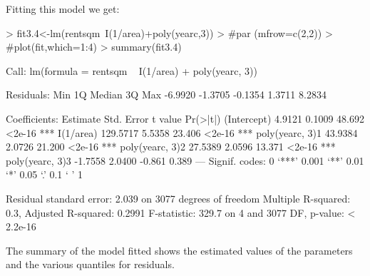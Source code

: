 \documentclass[12pt]{article}
\begin{document}
Fitting this model we get:
\begin{Schunk}
\begin{Sinput}
> fit3.4<-lm(rentsqm~I(1/area)+poly(yearc,3))
> #par (mfrow=c(2,2))
> #plot(fit,which=1:4)
> summary(fit3.4)
\end{Sinput}
\begin{Soutput}
Call:
lm(formula = rentsqm ~ I(1/area) + poly(yearc, 3))

Residuals:
    Min      1Q  Median      3Q     Max 
-6.9920 -1.3705 -0.1354  1.3711  8.2834 

Coefficients:
                Estimate Std. Error t value Pr(>|t|)    
(Intercept)       4.9121     0.1009  48.692   <2e-16 ***
I(1/area)       129.5717     5.5358  23.406   <2e-16 ***
poly(yearc, 3)1  43.9384     2.0726  21.200   <2e-16 ***
poly(yearc, 3)2  27.5389     2.0596  13.371   <2e-16 ***
poly(yearc, 3)3  -1.7558     2.0400  -0.861    0.389    
---
Signif. codes:  0 ‘***’ 0.001 ‘**’ 0.01 ‘*’ 0.05 ‘.’ 0.1 ‘ ’ 1 

Residual standard error: 2.039 on 3077 degrees of freedom
Multiple R-squared:   0.3,	Adjusted R-squared: 0.2991 
F-statistic: 329.7 on 4 and 3077 DF,  p-value: < 2.2e-16 
\end{Soutput}
\end{Schunk}

The summary of the model fitted shows the estimated values of the parameters and the various quantiles for residuals. 
\end{document}
